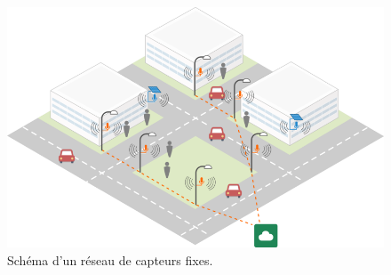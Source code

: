 \begin{figure}[h]
\centering
\includegraphics[width=0.8\linewidth]{./figures/cartographie/reseau_mesure.png}
\caption[Schéma d'un réseau de capteurs fixes]{Schéma d'un réseau de capteurs fixes\protect\footnotemark .}
\label{fig:reseau_capteur}
\end{figure}


